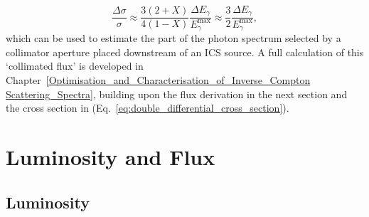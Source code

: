 \documentclass[../main.tex]{subfiles}
\begin{document}
\begin{equation}
\frac{\Delta\sigma}{\sigma} \approx \frac{3\left(2+X\right)}{4\left(1-X\right)}\frac{\Delta E_{\gamma}}{E_{\gamma}^{\mathrm{max}}} \approx \frac{3}{2}\frac{\Delta E_{\gamma}}{E_{\gamma}^{\mathrm{max}}},
\label{eq:cross_section_factor}    
\end{equation}
which can be used to estimate the part of the photon spectrum selected by a collimator aperture placed downstream of an ICS source. A full calculation of this `collimated flux' is developed in Chapter~\ref{Optimisation_and_Characterisation_of_Inverse_Compton Scattering_Spectra}, building upon the flux derivation in the next section and the cross section in (Eq.~\ref{eq:double_differential_cross_section}). 

\section{Luminosity and Flux}
\label{sec:luminosity_and_flux}

\subsection{Luminosity}
\end{document}
